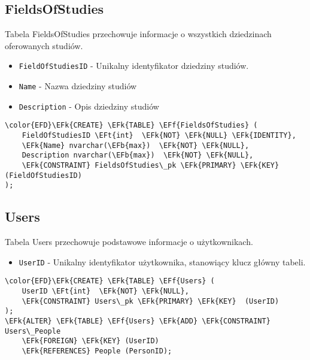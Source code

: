 \documentclass[11pt]{article}
\newcommand{\EFk}[1]{\textcolor{EFk}{\textbf{#1}}} %
\newcommand{\EFb}[1]{\textcolor{EFb}{\textbf{#1}}} %
\newcommand{\EFf}[1]{\textcolor{EFf}{#1}} %
\newcommand{\EFt}[1]{\textcolor{EFt}{\textbf{#1}}} %
\begin{document}
\subsection{FieldsOfStudies}
\label{sec:orge49df49}
Tabela FieldsOfStudies przechowuje informacje o wszystkich dziedzinach oferowanych studiów.
\begin{itemize}
\item \texttt{FieldOfStudiesID} - Unikalny identyfikator dziedziny studiów.
\item \texttt{Name} - Nazwa dziedziny studiów
\item \texttt{Description} - Opis dziedziny studiów
\end{itemize}
\begin{Code}
\begin{Verbatim}
\color{EFD}\EFk{CREATE} \EFk{TABLE} \EFf{FieldsOfStudies} (
    FieldOfStudiesID \EFt{int}  \EFk{NOT} \EFk{NULL} \EFk{IDENTITY},
    \EFk{Name} nvarchar(\EFb{max})  \EFk{NOT} \EFk{NULL},
    Description nvarchar(\EFb{max})  \EFk{NOT} \EFk{NULL},
    \EFk{CONSTRAINT} FieldsOfStudies\_pk \EFk{PRIMARY} \EFk{KEY}  (FieldOfStudiesID)
);
\end{Verbatim}
\end{Code}
\subsection{Users}
\label{sec:org4228ef7}
Tabela Users przechowuje podstawowe informacje o użytkownikach.
\begin{itemize}
\item \texttt{UserID} - Unikalny identyfikator użytkownika, stanowiący klucz główny tabeli.
\end{itemize}
\begin{Code}
\begin{Verbatim}
\color{EFD}\EFk{CREATE} \EFk{TABLE} \EFf{Users} (
    UserID \EFt{int}  \EFk{NOT} \EFk{NULL},
    \EFk{CONSTRAINT} Users\_pk \EFk{PRIMARY} \EFk{KEY}  (UserID)
);
\EFk{ALTER} \EFk{TABLE} \EFf{Users} \EFk{ADD} \EFk{CONSTRAINT} Users\_People
    \EFk{FOREIGN} \EFk{KEY} (UserID)
    \EFk{REFERENCES} People (PersonID);
\end{Verbatim}
\end{Code}
\end{document}
